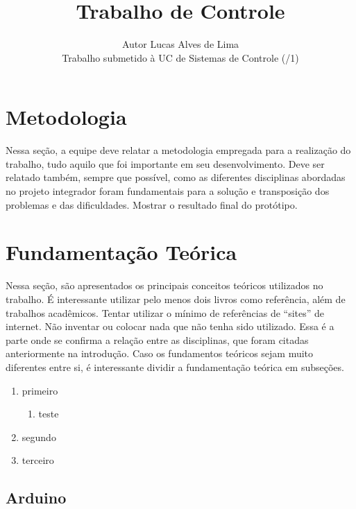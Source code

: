\documentclass{article}
\title{\textbf{Trabalho de Controle}}
\author{Autor Lucas Alves de Lima 
\\
Trabalho submetido à UC de Sistemas de Controle (\the\year{}/1)
}
\date{}
\begin{document}
\maketitle
\thispagestyle{fancy}





\section{Metodologia}
\label{metodologia}

Nessa seção, a equipe deve relatar a metodologia empregada para a realização do trabalho, tudo aquilo que foi importante em seu desenvolvimento. Deve ser relatado também, sempre que possível, como as diferentes disciplinas abordadas no projeto integrador foram fundamentais para a solução e transposição dos problemas e das dificuldades. Mostrar o resultado final do protótipo.

\section{Fundamentação Teórica}
\label{sec:fundamentacao}

Nessa seção, são apresentados os principais conceitos teóricos utilizados no trabalho. É interessante utilizar pelo menos dois livros como referência, além de trabalhos acadêmicos. Tentar utilizar o mínimo de referências de “sites” de internet. Não inventar ou colocar nada que não tenha sido utilizado. Essa é a parte onde se confirma a relação entre as disciplinas, que foram citadas anteriormente na introdução. Caso os fundamentos teóricos sejam muito diferentes entre si, é interessante dividir a fundamentação teórica em subseções.

\begin{enumerate}
    \item primeiro
    \begin{enumerate}
        \item teste
    \end{enumerate}
    \item segundo
    \item terceiro
\end{enumerate}





\subsection{Arduino}
\end{document}
